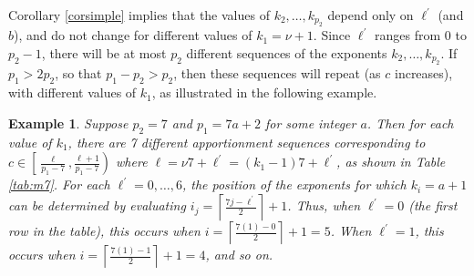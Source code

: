 \documentclass[pdflatex,sn-mathphys-num]{sn-jnl}
\theoremstyle{thmstyleone}%
\theoremstyle{thmstyletwo}%
\newtheorem{example}{Example}%
\theoremstyle{thmstylethree}%
\begin{document}
 
Corollary \ref{corsimple} implies that the values of $k_2, \ldots, k_{p_2}$ depend only on $\ell^\prime$ (and $b$), and  do not change for different values of $k_1=\nu+1$.  Since $\ell^\prime$ ranges from $0$ to $p_2-1$, there will be  at most $p_2$  different sequences
of the exponents $k_2, \ldots, k_{p_2}$. If  $p_1> 2p_2$, so that $p_1-p_2 > p_2$, then these sequences will repeat (as $c$ increases), with different values of $k_1$, as illustrated in the following example. 



\begin{example} Suppose $p_2=7$ and $p_1=7a+2$ for some integer $a$. Then for each value of $k_1$, there are 7 different apportionment sequences corresponding to $c \in \left[\frac{\ell}{p_1-7}, \frac{\ell+1}{p_1-7}\right)$ where $\ell = \nu 7+\ell^\prime= (k_1-1)7+\ell^\prime$, as shown in Table  \ref{tab:m7}.  For each $\ell^\prime = 0, \ldots , 6$, the position of the exponents for which $k_i=a+1$ can be determined by evaluating $i_j = \left\lceil \frac{7j-\ell^\prime}{2} \right\rceil+ 1$.  Thus, when $\ell^\prime=0$ (the first row in the table),  this occurs when $i = \left\lceil \frac{7(1)-0}{2} \right\rceil+ 1= 5$. When $\ell^\prime=1$, this occurs when $i = \left\lceil \frac{7(1)-1}{2}\right\rceil + 1=4$, and so on.




\end{example}
\end{document}
